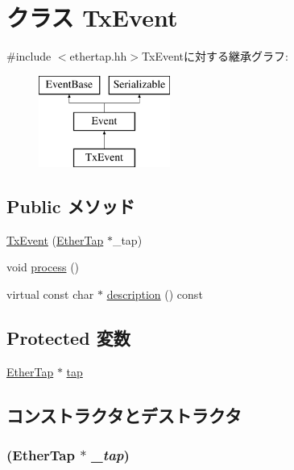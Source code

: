 \hypertarget{classEtherTap_1_1TxEvent}{
\section{クラス TxEvent}
\label{classEtherTap_1_1TxEvent}
}


{\ttfamily \#include $<$ethertap.hh$>$}TxEventに対する継承グラフ:\begin{figure}[H]
\begin{center}
\leavevmode
\includegraphics[height=3cm]{classEtherTap_1_1TxEvent}
\end{center}
\end{figure}
\subsection*{Public メソッド}
\begin{DoxyCompactItemize}
\item 
\hyperlink{classEtherTap_1_1TxEvent_a1dc7a4f018850c2ba0c42bad4d0c3864}{TxEvent} (\hyperlink{classEtherTap}{EtherTap} $\ast$\_\-tap)
\item 
void \hyperlink{classEtherTap_1_1TxEvent_a2e9c5136d19b1a95fc427e0852deab5c}{process} ()
\item 
virtual const char $\ast$ \hyperlink{classEtherTap_1_1TxEvent_a130ddddf003422b413e2e891b1b80e8f}{description} () const 
\end{DoxyCompactItemize}
\subsection*{Protected 変数}
\begin{DoxyCompactItemize}
\item 
\hyperlink{classEtherTap}{EtherTap} $\ast$ \hyperlink{classEtherTap_1_1TxEvent_afceac4e4f9153ef0f38b7c423422dd2e}{tap}
\end{DoxyCompactItemize}


\subsection{コンストラクタとデストラクタ}
\hypertarget{classEtherTap_1_1TxEvent_a1dc7a4f018850c2ba0c42bad4d0c3864}{
\subsubsection[{TxEvent}]{ ({\bf EtherTap} $\ast$ {\em \_\-tap})}}
\label{classEtherTap_1_1TxEvent_a1dc7a4f018850c2ba0c42bad4d0c3864}



